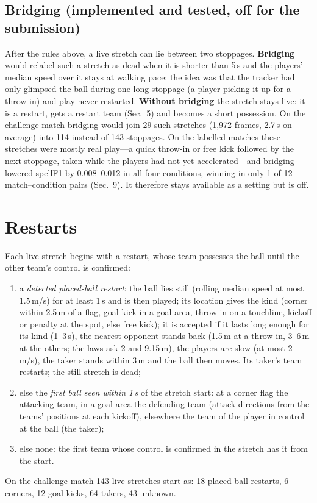 \documentclass[10pt,a4paper]{article}
\begin{document}
\subsection{Bridging (implemented and tested, off for the submission)}
After the rules above, a live stretch can lie between two stoppages. \textbf{Bridging} would relabel such a stretch as dead when
it is shorter than 5\,s and the players' median speed over it stays at walking pace: the idea was that the tracker had only
glimpsed the ball during one long stoppage (a player picking it up for a throw-in) and play never restarted. \textbf{Without
bridging} the stretch stays live: it is a restart, gets a restart team (Sec.~5) and becomes a short possession. On the challenge
match bridging would join 29 such stretches (1{,}972 frames, 2.7\,s on average) into 114 instead of 143 stoppages. On the
labelled matches these stretches were mostly real play---a quick throw-in or free kick followed by the next stoppage, taken
while the players had not yet accelerated---and bridging lowered spellF1 by 0.008--0.012 in all four conditions, winning in
only 1 of 12 match--condition pairs (Sec.~9). It therefore stays available as a setting but is off.

\section{Restarts}
Each live stretch begins with a restart, whose team possesses the ball until the other team's control is confirmed:
\begin{enumerate}
\item a \emph{detected placed-ball restart}: the ball lies still (rolling median speed at most 1.5\,m/s) for at least 1\,s and is
      then played; its location gives the kind (corner within 2.5\,m of a flag, goal kick in a goal area, throw-in on a touchline,
      kickoff or penalty at the spot, else free kick); it is accepted if it lasts long enough for its kind (1--3\,s), the nearest
      opponent stands back (1.5\,m at a throw-in, 3--6\,m at the others; the laws ask 2 and 9.15\,m), the players are slow (at
      most 2\,m/s), the taker stands within 3\,m and the ball then moves. Its taker's team restarts; the still stretch is dead;
\item else the \emph{first ball seen within 1\,s} of the stretch start: at a corner flag the attacking team, in a goal area the
      defending team (attack directions from the teams' positions at each kickoff), elsewhere the team of the player in control
      at the ball (the taker);
\item else none: the first team whose control is confirmed in the stretch has it from the start.
\end{enumerate}
On the challenge match 143 live stretches start as: 18 placed-ball restarts, 6 corners, 12 goal kicks, 64 takers, 43 unknown.
\end{document}
